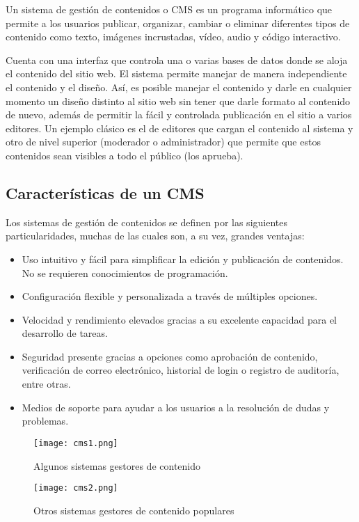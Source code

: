 \cite{mdn}Un sistema de gestión de contenidos o CMS es un programa informático que permite a los usuarios publicar, organizar, cambiar o eliminar diferentes tipos de contenido como texto, imágenes incrustadas, vídeo, audio y código interactivo.

\cite{wiki}Cuenta con una interfaz que controla una o varias bases de datos donde se aloja el contenido del sitio web. El sistema permite manejar de manera independiente el contenido y el diseño. Así, es posible manejar el contenido y darle en cualquier momento un diseño distinto al sitio web sin tener que darle formato al contenido de nuevo, además de permitir la fácil y controlada publicación en el sitio a varios editores. Un ejemplo clásico es el de editores que cargan el contenido al sistema y otro de nivel superior (moderador o administrador) que permite que estos contenidos sean visibles a todo el público (los aprueba).

\subsection{Características de un CMS}
Los sistemas de gestión de contenidos se definen por las siguientes particularidades, muchas de las cuales son, a su vez, grandes ventajas:

\begin{itemize}
	\item Uso intuitivo y fácil para simplificar la edición y publicación de contenidos. No se requieren conocimientos de programación.
	\item Configuración flexible y personalizada a través de múltiples opciones.
	\item Velocidad y rendimiento elevados gracias a su excelente capacidad para el desarrollo de tareas.
	\item Seguridad presente gracias a opciones como aprobación de contenido, verificación de correo electrónico, historial de login o registro de auditoría, entre otras.
	\item Medios de soporte para ayudar a los usuarios a la resolución de dudas y problemas.
\end{itemize}

\begin{figure}[H]
	\center
	\texttt{[image: cms1.png]}
	\caption{Algunos sistemas gestores de contenido}
	\label{fig:super}
\end{figure}

\begin{figure}[H]
	\center
	\texttt{[image: cms2.png]}
	\caption{Otros sistemas gestores de contenido populares}
	\label{fig:super}
\end{figure}

